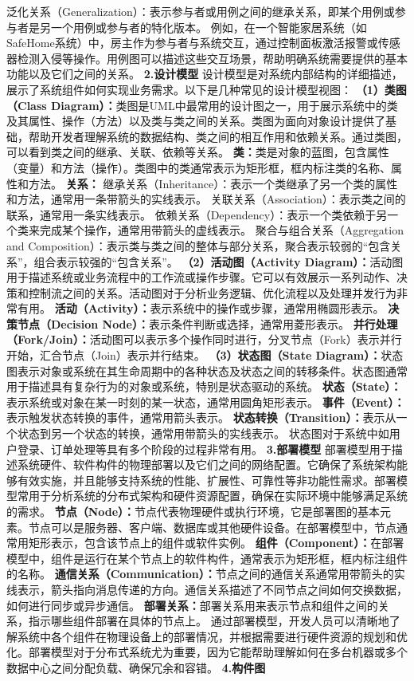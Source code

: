 {泛化关系（Generalization）：表示参与者或用例之间的继承关系，即某个用例或参与者是另一个用例或参与者的特化版本。 例如，在一个智能家居系统（如SafeHome系统）中，房主作为参与者与系统交互，通过控制面板激活报警或传感器检测入侵等操作。用例图可以描述这些交互场景，帮助明确系统需要提供的基本功能以及它们之间的关系。 \textbf{2.设计模型} 设计模型是对系统内部结构的详细描述，展示了系统组件如何实现业务需求。以下是几种常见的设计模型视图： \textbf{（1）类图（Class Diagram）：}类图是UML中最常用的设计图之一，用于展示系统中的类及其属性、操作（方法）以及类与类之间的关系。类图为面向对象设计提供了基础，帮助开发者理解系统的数据结构、类之间的相互作用和依赖关系。通过类图，可以看到类之间的继承、关联、依赖等关系。 \textbf{类：}类是对象的蓝图，包含属性（变量）和方法（操作）。类图中的类通常表示为矩形框，框内标注类的名称、属性和方法。 \textbf{关系：} 继承关系（Inheritance）：表示一个类继承了另一个类的属性和方法，通常用一条带箭头的实线表示。 关联关系（Association）：表示类之间的联系，通常用一条实线表示。 依赖关系（Dependency）：表示一个类依赖于另一个类来完成某个操作，通常用带箭头的虚线表示。 聚合与组合关系（Aggregation and Composition）：表示类与类之间的整体与部分关系，聚合表示较弱的``包含关系''，组合表示较强的``包含关系''。 \textbf{（2）活动图（Activity Diagram）：}活动图用于描述系统或业务流程中的工作流或操作步骤。它可以有效展示一系列动作、决策和控制流之间的关系。活动图对于分析业务逻辑、优化流程以及处理并发行为非常有用。 \textbf{活动（Activity）：}表示系统中的操作或步骤，通常用椭圆形表示。 \textbf{决策节点（Decision Node）：}表示条件判断或选择，通常用菱形表示。 \textbf{并行处理（Fork/Join）：}活动图可以表示多个操作同时进行，分叉节点（Fork）表示并行开始，汇合节点（Join）表示并行结束。 \textbf{（3）状态图（State Diagram）：}状态图表示对象或系统在其生命周期中的各种状态及状态之间的转移条件。状态图通常用于描述具有复杂行为的对象或系统，特别是状态驱动的系统。 \textbf{状态（State）：}表示系统或对象在某一时刻的某一状态，通常用圆角矩形表示。 \textbf{事件（Event）：}表示触发状态转换的事件，通常用箭头表示。 \textbf{状态转换（Transition）：}表示从一个状态到另一个状态的转换，通常用带箭头的实线表示。 状态图对于系统中如用户登录、订单处理等具有多个阶段的过程非常有用。 \textbf{3.部署模型} 部署模型用于描述系统硬件、软件构件的物理部署以及它们之间的网络配置。它确保了系统架构能够有效实施，并且能够支持系统的性能、扩展性、可靠性等非功能性需求。部署模型常用于分析系统的分布式架构和硬件资源配置，确保在实际环境中能够满足系统的需求。 \textbf{节点（Node）：}节点代表物理硬件或执行环境，它是部署图的基本元素。节点可以是服务器、客户端、数据库或其他硬件设备。在部署模型中，节点通常用矩形表示，包含该节点上的组件或软件实例。 \textbf{组件（Component）：}在部署模型中，组件是运行在某个节点上的软件构件，通常表示为矩形框，框内标注组件的名称。 \textbf{通信关系（Communication）：}节点之间的通信关系通常用带箭头的实线表示，箭头指向消息传递的方向。通信关系描述了不同节点之间如何交换数据，如何进行同步或异步通信。 \textbf{部署关系：}部署关系用来表示节点和组件之间的关系，指示哪些组件部署在具体的节点上。 通过部署模型，开发人员可以清晰地了解系统中各个组件在物理设备上的部署情况，并根据需要进行硬件资源的规划和优化。部署模型对于分布式系统尤为重要，因为它能帮助理解如何在多台机器或多个数据中心之间分配负载、确保冗余和容错。 \textbf{4.构件图} }
